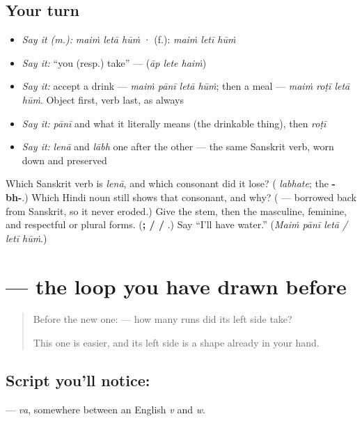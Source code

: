 \subsection*{Your turn}
\begin{itemize}
\raggedright
  \item \emph{Say it (m.):} \emph{maiṁ letā hūṁ}  ·  (f.): \emph{maiṁ letī hūṁ}
  \item \emph{Say it:} \textquotedblleft{}you (resp.) take\textquotedblright{} — \textbf{  } (\emph{āp lete haiṁ})
  \item \emph{Say it:} accept a drink — \emph{maiṁ pānī letā hūṁ}; then a meal — \emph{maiṁ roṭī letā hūṁ}. Object first, verb last, as always
  \item \emph{Say it:} \emph{pānī} and what it literally means (the drinkable thing), then \emph{roṭī}
  \item \emph{Say it:} \emph{lenā} and \emph{lābh} one after the other — the same Sanskrit verb, worn down and preserved
\end{itemize}

\begin{tcolorbox}[breakable,colback=teal!4,colframe=teal!35!black,title={Before you move on}]
Which Sanskrit verb is \emph{lenā}, and which consonant did it lose? (\textbf{} \emph{labhate}; the \textbf{-bh-}.) Which Hindi noun still shows that consonant, and why? (\textbf{} — borrowed back from Sanskrit, so it never eroded.) Give the stem, then the masculine, feminine, and respectful or plural forms. (\textbf{;  /  / }.) Say \textquotedblleft{}I'll have water.\textquotedblright{} (\emph{Maiṁ pānī letā / letī hūṁ}.)
\end{tcolorbox}
\section[\texorpdfstring{\hi{व} (va)}{व (va)}]{ — the loop you have drawn before}

\label{lesson:HI-S146-letter-va}



\begin{quote}
Before the new one: \textbf{} — how many runs did its left side take?

This one is easier, and its left side is a shape already in your hand.
\end{quote}

\subsection*{Script you'll notice: }
\textbf{} — \emph{va}, somewhere between an English \emph{v} and \emph{w}.

